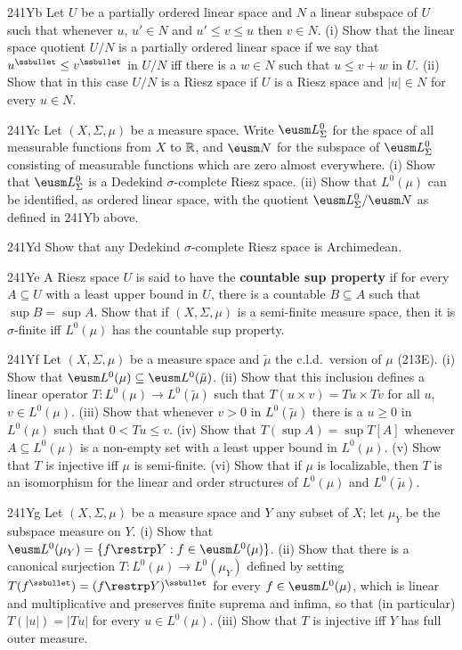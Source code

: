 {\spheader 241Yb Let $U$ be a partially ordered linear space and
$N$ a linear subspace of $U$ such that whenever $u$, $u'\in N$ and
$u'\le v\le u$ then $v\in N$.   (i) Show that the linear space quotient
$U/N$ is a
partially ordered linear space if we say that
$u^{\ssbullet}\le v^{\ssbullet}$ in $U/N$ iff there is a $w\in N$ such
that $u\le v+w$ in
$U$.   (ii) Show that in this case $U/N$ is a Riesz space if $U$ is a
Riesz space and $|u|\in N$ for every $u\in N$.

\spheader 241Yc Let $(X,\Sigma,\mu)$ be a measure space.   Write
$\eusm L^0_{\Sigma}$ for the space of all measurable functions
from $X$ to $\Bbb R$, and $\eusm N$ for the subspace of
$\eusm L^0_{\Sigma}$ consisting of measurable functions which are
zero almost everywhere.   (i) Show that $\eusm L^0_{\Sigma}$ is a
Dedekind $\sigma$-complete Riesz space.   (ii) Show that $L^0(\mu)$ can
be identified, as ordered linear space, with the quotient
$\eusm L^0_{\Sigma}/\eusm N$ as defined in 241Yb above.

\spheader 241Yd Show that any Dedekind
$\sigma$-complete Riesz space is Archimedean.

\spheader 241Ye A Riesz space $U$ is said to have the
{\bf countable sup property} if for every $A\subseteq U$ with a least
upper bound in $U$, there is a countable $B\subseteq A$ such that
$\sup B=\sup A$.   Show that if $(X,\Sigma,\mu)$ is a
semi-finite measure space, then it is
$\sigma$-finite iff $L^0(\mu)$ has the countable sup property.

\spheader 241Yf
Let $(X,\Sigma,\mu)$ be a measure space and $\tilde\mu$ the c.l.d.\
version of $\mu$ (213E).   (i) Show that
$\eusm L^0(\mu)\subseteq\eusm L^0(\tilde\mu)$.   (ii) Show that this
inclusion defines a linear operator
$T:L^0(\mu)\to L^0(\tilde\mu)$ such that $T(u\times v)=Tu\times Tv$ for
all $u$, $v\in L^0(\mu)$.   (iii) Show that whenever $v>0$ in
$L^0(\tilde\mu)$ there is a $u\ge 0$ in $L^0(\mu)$ such that
$0<Tu\le v$.   (iv) Show that
$T(\sup A)=\sup T[A]$ whenever $A\subseteq L^0(\mu)$ is a non-empty set
with a least upper bound in $L^0(\mu)$.   (v) Show that $T$ is injective
iff $\mu$ is semi-finite.   (vi) Show that if $\mu$ is localizable, then
$T$ is an isomorphism for the linear and order structures of $L^0(\mu)$
and $L^0(\tilde\mu)$.   \Hint{213Hb.}

\spheader 241Yg Let $(X,\Sigma,\mu)$ be a measure space and $Y$
any subset of $X$;  let $\mu_Y$ be the subspace measure on $Y$.   (i)
Show that $\eusm L^0(\mu_Y)=\{f\restrp Y:f\in\eusm L^0(\mu)\}$.   (ii)
Show that there is a canonical surjection $T:L^0(\mu)\to L^0(\mu_Y)$
defined by setting $T(f^{\ssbullet})=(f\restrp Y)^{\ssbullet}$ for every $f\in\eusm L^0(\mu)$, which is linear and multiplicative and preserves finite suprema and infima, so that (in particular)
$T(|u|)=|Tu|$ for every $u\in L^0(\mu)$.   (iii) Show that $T$ is injective iff $Y$ has full outer measure.

}
